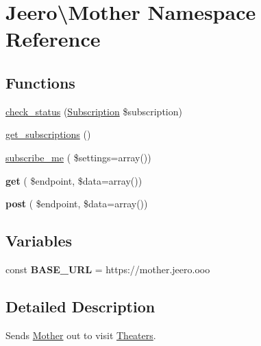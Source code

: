 \hypertarget{namespaceJeero_1_1Mother}{}\section{Jeero\textbackslash{}Mother Namespace Reference}
\label{namespaceJeero_1_1Mother}
\subsection*{Functions}
\begin{DoxyCompactItemize}
\item 
\hyperlink{namespaceJeero_1_1Mother_ad8898f9d86248f6c1999c6bed607a939}{check\+\_\+status} (\hyperlink{classJeero_1_1Subscriptions_1_1Subscription}{Subscription} \$subscription)
\item 
\hyperlink{namespaceJeero_1_1Mother_af3a7a0928f56dae13cf5380a264e8a91}{get\+\_\+subscriptions} ()
\item 
\hyperlink{namespaceJeero_1_1Mother_a379b77ef6336a987a5359b5b28212259}{subscribe\+\_\+me} ( \$settings=array())
\item 
\mbox{\label{namespaceJeero_1_1Mother_a8e51738b255a4f47b25aab29166d93c5}} 
{\bfseries get} ( \$endpoint, \$data=array())
\item 
\mbox{\label{namespaceJeero_1_1Mother_a481c663ee8111e8d35e10214eecd2725}} 
{\bfseries post} ( \$endpoint, \$data=array())
\end{DoxyCompactItemize}
\subsection*{Variables}
\begin{DoxyCompactItemize}
\item 
\mbox{\label{namespaceJeero_1_1Mother_a66d3570f9eaddc0483d4623549d265f4}} 
const {\bfseries B\+A\+S\+E\+\_\+\+U\+RL} = \textquotesingle{}https\+://mother.\+jeero.\+ooo\textquotesingle{}
\end{DoxyCompactItemize}


\subsection{Detailed Description}
Sends \hyperlink{namespaceJeero_1_1Mother}{Mother} out to visit \hyperlink{namespaceJeero_1_1Theaters}{Theaters}. 

